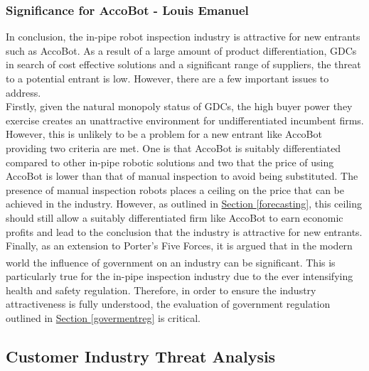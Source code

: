 \documentclass[11pt]{article}		%
\newcommand{\supercite}[1]{\textsuperscript{\cite{#1}}}		%
\newcommand{\sectref}[1]{\hyperref[#1]{Section \ref*{#1}}}     %
\begin{document}
			\subsubsection{Significance for AccoBot - Louis Emanuel}
			
				In conclusion, the in-pipe robot inspection industry is attractive for new entrants such as AccoBot. As a result of a large amount of product differentiation, GDCs in search of cost effective solutions and a significant range of suppliers, the threat to a potential entrant is low. However, there are a few important issues to address. 
				\\
				\hspace*{2ex}Firstly, given the natural monopoly status of GDCs, the high buyer power they exercise creates an unattractive environment for undifferentiated incumbent firms. However, this is unlikely to be a problem for a new entrant like AccoBot providing two criteria are met. One is that AccoBot is suitably differentiated compared to other in-pipe robotic solutions and two that the price of using AccoBot is lower than that of manual inspection to avoid being substituted. The presence of manual inspection robots places a ceiling on the price that can be achieved in the industry. However, as outlined in \sectref{forecasting}, this ceiling should still allow a suitably differentiated firm like AccoBot to earn economic profits and lead to the conclusion that the industry is attractive for new entrants. 
				\\
                \hspace*{2ex}Finally, as an extension to Porter's Five Forces, it is argued that in the modern world the influence of government on an industry can be significant\supercite{GovHBR}. This is particularly true for the in-pipe inspection industry due to the ever intensifying health and safety regulation. Therefore, in order to ensure the industry attractiveness is fully understood, the evaluation of government regulation outlined in \sectref{govermentreg} is critical. 
			    
	\subsection{Customer Industry Threat Analysis}\label{customerIndustry}
	
\end{document}
